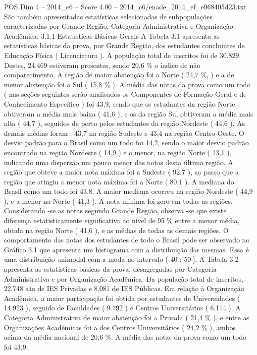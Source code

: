 \begin{textsample}{POS Dim 4 – 2014\_c6 – Score 4.00 – 2014\_c6/enade\_2014\_ef\_e968405d23.txt}
São também apresentadas estatísticas selecionadas de subpopulações caracterizadas por Grande Região, Categoria Administrativa e Organização Acadêmica. 3.1.1 Estatísticas Básicas Gerais A Tabela 3.1 apresenta as estatísticas básicas da prova, por Grande Região, dos estudantes concluintes de Educação Física ( Licenciatura ).
A população total de inscritos foi de 30.829.
Destes, 24.469 estiveram presentes, sendo 20,6 \% o índice de não comparecimento.
A região de maior abstenção foi a Norte ( 24,7 \%, ) e a de menor abstenção foi a Sul ( 15,8 \% ).
A média das notas da prova como um todo ( nas seções seguintes serão analisados os Componentes de Formação Geral e de Conhecimento Específico ) foi 43,9, sendo que os estudantes da região Norte obtiveram a média mais baixa ( 41,6 ), e os da região Sul obtiveram a média mais alta ( 44,7 ), seguidos de perto pelos estudantes da região Nordeste ( 44,6 ).
As demais médias foram : 43,7 na região Sudeste e 43,4 na região Centro-Oeste.
O desvio padrão para o Brasil como um todo foi 14,2, sendo o maior desvio padrão encontrado na região Nordeste ( 14,9 ) e o menor, na região Norte ( 13,1 ), indicando uma dispersão um pouco menor das notas desta última região.
A região que obteve a maior nota máxima foi a Sudeste ( 92,7 ), ao passo que a região que atingiu a menor nota máxima foi a Norte ( 80,1 ).
A mediana do Brasil como um todo foi 43,8.
A maior mediana ocorreu na região Nordeste ( 44,9 ), e a menor na Norte ( 41,3 ).
A nota mínima foi zero em todas as regiões.
Considerando -se as notas segundo Grande Região, observa -se que existe diferença estatisticamente significativa ao nível de 95 \% entre a menor média, obtida na região Norte ( 41,6 ), e as médias de todas as demais regiões.
O comportamento das notas dos estudantes de todo o Brasil pode ser observado no Gráfico 3.1 que apresenta um histograma com a distribuição das mesmas.
Essa é uma distribuição unimodal com a moda no intervalo ( 40 ; 50 ].
A Tabela 3.2 apresenta as estatísticas básicas da prova, desagregadas por Categoria Administrativa e por Organização Acadêmica.
Da população total de inscritos, 22.748 são de IES Privadas e 8.081 de IES Públicas.
Em relação à Organização Acadêmica, a maior participação foi obtida por estudantes de Universidades ( 14.923 ), seguido de Faculdades ( 9.792 ) e Centros Universitários ( 6.114 ).
A Categoria Administrativa de maior abstenção foi a Privada ( 21,4 \% ), e entre as Organizações Acadêmicas foi a dos Centros Universitários ( 24,2 \% ), ambos acima da média nacional de 20,6 \%.
A média das notas da prova como um todo foi 43,9.

\end{textsample}
